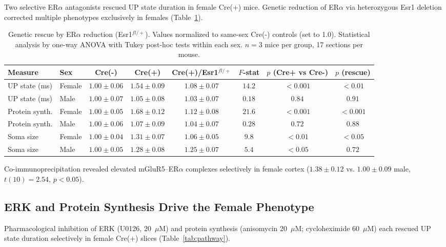 \documentclass[11pt]{article}
\begin{document}
Two selective ER$\alpha$ antagonists rescued UP state duration in female Cre(+) mice. Genetic reduction of ER$\alpha$ via heterozygous Esr1 deletion corrected multiple phenotypes exclusively in females (Table~\ref{tab:eralpha}).

\begin{table}[H]
\centering
\caption{Genetic rescue by ER$\alpha$ reduction (Esr1$^{fl/+}$). Values normalized to same-sex Cre(-) controls (set to 1.0). Statistical analysis by one-way ANOVA with Tukey post-hoc tests within each sex. $n = 3$ mice per group, 17 sections per mouse.}
\label{tab:eralpha}
\begin{tabular}{llcccccc}
\toprule
\textbf{Measure} & \textbf{Sex} & \textbf{Cre(-)} & \textbf{Cre(+)} & \textbf{Cre(+)/Esr1$^{fl/+}$} & \textbf{$F$-stat} & \textbf{$p$ (Cre+ vs Cre-)} & \textbf{$p$ (rescue)} \\
\midrule
UP state (ms) & Female & $1.00 \pm 0.06$ & $1.54 \pm 0.09$ & $1.08 \pm 0.07$ & $14.2$ & $< 0.001$ & $< 0.01$ \\
UP state (ms) & Male & $1.00 \pm 0.07$ & $1.05 \pm 0.08$ & $1.03 \pm 0.07$ & $0.18$ & $0.84$ & $0.91$ \\
Protein synth. & Female & $1.00 \pm 0.05$ & $1.68 \pm 0.12$ & $1.12 \pm 0.08$ & $21.6$ & $< 0.001$ & $< 0.001$ \\
Protein synth. & Male & $1.00 \pm 0.06$ & $1.07 \pm 0.09$ & $1.04 \pm 0.07$ & $0.28$ & $0.72$ & $0.88$ \\
Soma size & Female & $1.00 \pm 0.04$ & $1.31 \pm 0.07$ & $1.06 \pm 0.05$ & $9.8$ & $< 0.01$ & $< 0.05$ \\
Soma size & Male & $1.00 \pm 0.05$ & $1.28 \pm 0.08$ & $1.25 \pm 0.07$ & $5.4$ & $< 0.05$ & $0.72$ \\
\bottomrule
\end{tabular}
\end{table}

Co-immunoprecipitation revealed elevated mGluR5--ER$\alpha$ complexes selectively in female cortex ($1.38 \pm 0.12$ vs. $1.00 \pm 0.09$ male, $t(10) = 2.54$, $p < 0.05$).

\subsection{ERK and Protein Synthesis Drive the Female Phenotype}

Pharmacological inhibition of ERK (U0126, 20~$\mu$M) and protein synthesis (anisomycin 20~$\mu$M; cycloheximide 60~$\mu$M) each rescued UP state duration selectively in female Cre(+) slices (Table~\ref{tab:pathway}).
\end{document}
